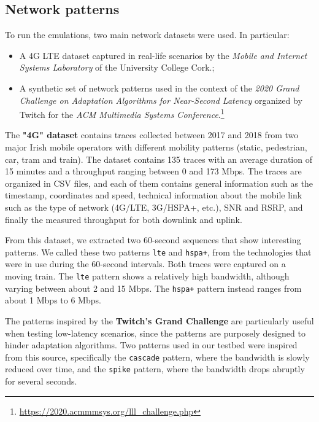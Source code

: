 \subsection{Network patterns}
\label{sec:testbed/network/patterns}

To run the emulations, two main network datasets were used. In particular:

\begin{itemize}
    \item A 4G LTE dataset captured in real-life scenarios by the \textit{Mobile and Internet Systems Laboratory} of the University College Cork.\cite{dataset1};
    \item A synthetic set of network patterns used in the context of the \textit{2020 Grand Challenge on Adaptation Algorithms for Near-Second Latency} organized by Twitch for the \textit{ACM Multimedia Systems Conference}.\footnote{\url{https://2020.acmmmsys.org/lll_challenge.php}}
\end{itemize}

The \textbf{"4G" dataset} contains traces collected between 2017 and 2018 from two major Irish mobile operators with different mobility patterns (static, pedestrian, car, tram and train). The dataset contains 135 traces with an average duration of 15 minutes and a throughput ranging between 0 and 173 Mbps. The traces are organized in CSV files, and each of them contains general information such as the timestamp, coordinates and speed, technical information about the mobile link such as the type of network (4G/LTE, 3G/HSPA+, etc.), SNR and RSRP, and finally the measured throughput for both downlink and uplink.

From this dataset, we extracted two 60-second sequences that show interesting patterns. We called these two patterns \texttt{lte} and \texttt{hspa+}, from the technologies that were in use during the 60-second intervals. Both traces were captured on a moving train. The \texttt{lte} pattern shows a relatively high bandwidth, although varying between about 2 and 15 Mbps. The \texttt{hspa+} pattern instead ranges from about 1 Mbps to 6 Mbps.

The patterns inspired by the \textbf{Twitch's Grand Challenge} are particularly useful when testing low-latency scenarios, since the patterns are purposely designed to hinder adaptation algorithms. Two patterns used in our testbed were inspired from this source, specifically the \texttt{cascade} pattern, where the bandwidth is slowly reduced over time, and the \texttt{spike} pattern, where the bandwidth drops abruptly for several seconds.

